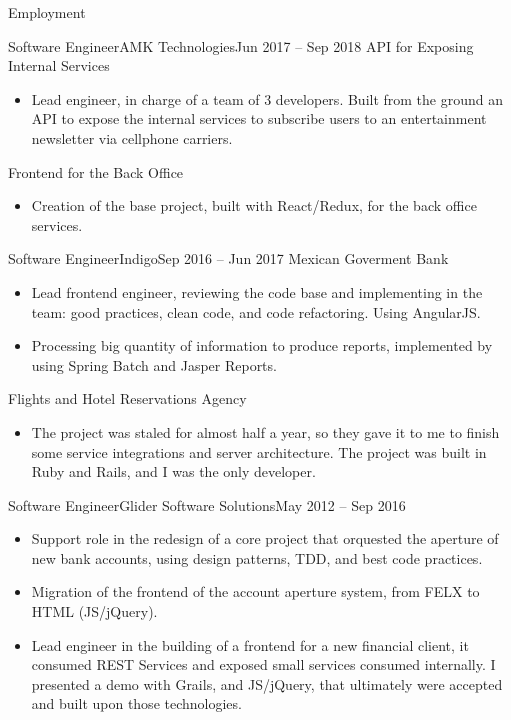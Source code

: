 \documentclass[]{mcdowellcv}
\begin{document}
	\makeheader
	
	\begin{cvsection}{Employment}
		\begin{cvsubsection}{Software Engineer}{AMK Technologies}{Jun 2017 -- Sep 2018}
			API for Exposing Internal Services
			\begin{itemize}
				\item Lead engineer, in charge of a team of 3 developers. Built from the ground an API to expose the internal services to subscribe users to an entertainment newsletter via cellphone carriers.
			\end{itemize}
			Frontend for the Back Office
			\begin{itemize}
				\item Creation of the base project, built with React/Redux, for the back office services.
			\end{itemize}
		\end{cvsubsection}

		\begin{cvsubsection}{Software Engineer}{Indigo}{Sep 2016 -- Jun 2017}		
			Mexican Goverment Bank
			\begin{itemize}
				\item Lead frontend engineer, reviewing the code base and implementing in the team: good practices, clean code, and code refactoring. Using AngularJS.
				\item Processing big quantity of information to produce reports, implemented by using Spring Batch and Jasper Reports.
			\end{itemize}
			Flights and Hotel Reservations Agency
			\begin{itemize}
				\item The project was staled for almost half a year, so they gave it to me to finish some service integrations and server architecture. The project was built in Ruby and Rails, and I was the only developer.
			\end{itemize}
		\end{cvsubsection}
		
		\begin{cvsubsection}{Software Engineer}{Glider Software Solutions}{May 2012 -- Sep 2016}	
			\begin{itemize}
				\item Support role in the redesign of a core project that orquested the aperture of new bank accounts, using design patterns, TDD, and best code practices.
				\item Migration of the frontend of the account aperture system, from FELX to HTML (JS/jQuery).
				\item Lead engineer in the building of a frontend for a new financial client, it consumed REST Services and exposed small services consumed internally. I presented a demo with Grails, and JS/jQuery, that ultimately were accepted and built upon those technologies.
			\end{itemize}
		\end{cvsubsection}
		

\end{cvsection}
\end{document}

